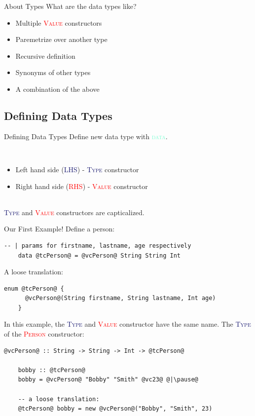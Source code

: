 \documentclass[xcolor={usenames,dvipsnames}]{beamer}
\newcommand{\hkeyword}[1]{\textcolor{Aquamarine}{\textsc{#1}}}
\newcommand{\htycon}[1]{\textcolor{MidnightBlue}{\textsc{#1}}}
\newcommand{\hvalcon}[1]{\textcolor{Red}{\textsc{#1}}}
\begin{document}
\begin{frame}[fragile]{About Types}
  What are the data types like?
  \pause
  \begin{itemize}
    \item Multiple \hvalcon{Value} constructors
    \pause
    \item Paremetrize over another type
    \pause
    \item Recursive definition
    \pause
    \item Synonyms of other types
    \pause
    \item A combination of the above
  \end{itemize}
\end{frame}

\subsection{Defining Data Types}
\begin{frame}[fragile]{Defining Data Types}
  Define new data type with \hkeyword{data}.

  \pause
  \ \\
  \begin{itemize}
    \item Left hand side (\htycon{LHS}) - \htycon{Type} constructor
    \item Right hand side (\hvalcon{RHS}) - \hvalcon{Value} constructor
  \end{itemize}

  \pause
  \ \\
  \htycon{Type} and \hvalcon{Value} constructors are capticalized.
\end{frame}

\begin{frame}[fragile]{Our First Example!}
  Define a person:
  \begin{lstlisting}[style=hask]
    -- | params for firstname, lastname, age respectively
    data @tcPerson@ = @vcPerson@ String String Int
  \end{lstlisting}

  \pause
  A loose translation:
  \begin{lstlisting}[style=hask]
    enum @tcPerson@ {
      @vcPerson@(String firstname, String lastname, Int age)
    }
  \end{lstlisting}

  \pause
  In this example, the \htycon{Type} and \hvalcon{Value} constructor have the same name. The \htycon{Type} of the \hvalcon{Person} constructor:
  \begin{lstlisting}[style=hask]
    @vcPerson@ :: String -> String -> Int -> @tcPerson@

    bobby :: @tcPerson@
    bobby = @vcPerson@ "Bobby" "Smith" @vc23@ @|\pause@

    -- a loose translation:
    @tcPerson@ bobby = new @vcPerson@("Bobby", "Smith", 23)
  \end{lstlisting}
\end{frame}
\end{document}
